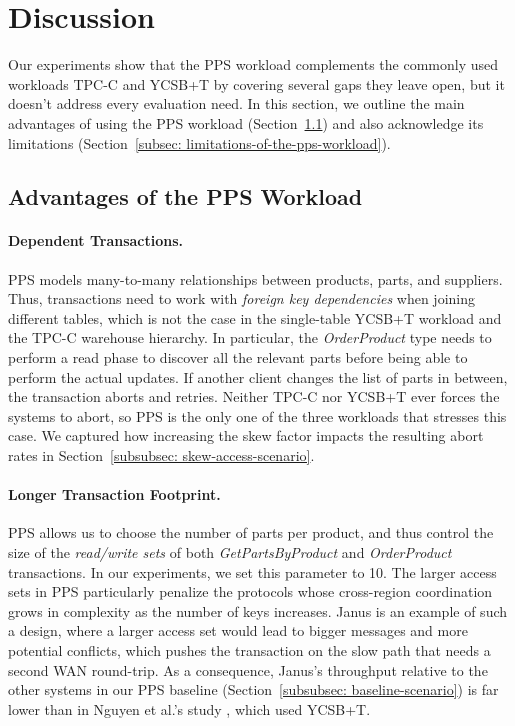 \section{Discussion}
\label{sec: discussion}
Our experiments show that the PPS workload complements the commonly used workloads TPC-C and YCSB+T by covering several gaps they leave open, but it doesn't address every evaluation need. In this section, we outline the main advantages of using the PPS workload (Section~\ref{subsec: advantages-of-the-pps-workload}) and also acknowledge its limitations (Section~\ref{subsec: limitations-of-the-pps-workload}).

\subsection{Advantages of the PPS Workload}
\label{subsec: advantages-of-the-pps-workload}
\paragraph{Dependent Transactions.}
PPS models many-to-many relationships between products, parts, and suppliers. Thus, transactions need to work with \textit{foreign key dependencies} when joining different tables, which is not the case in the single-table YCSB+T workload and the TPC-C warehouse hierarchy. In particular, the \textit{OrderProduct} type needs to perform a read phase to discover all the relevant parts before being able to perform the actual updates. If another client changes the list of parts in between, the transaction aborts and retries. Neither TPC-C nor YCSB+T ever forces the systems to abort, so PPS is the only one of the three workloads that stresses this case. We captured how increasing the skew factor impacts the resulting abort rates in Section~\ref{subsubsec: skew-access-scenario}.

\paragraph{Longer Transaction Footprint.}
PPS allows us to choose the number of parts per product, and thus control the size of the \textit{read/write sets} of both \textit{GetPartsByProduct} and \textit{OrderProduct} transactions. In our experiments, we set this parameter to 10. The larger access sets in PPS particularly penalize the protocols whose cross-region coordination grows in complexity as the number of keys increases. Janus is an example of such a design, where a larger access set would lead to bigger messages and more potential conflicts, which pushes the transaction on the slow path that needs a second WAN round-trip. As a consequence, Janus's throughput relative to the other systems in our PPS baseline (Section~\ref{subsubsec: baseline-scenario}) is far lower than in Nguyen et al.'s study \cite{nguyen2023detock}, which used YCSB+T.

